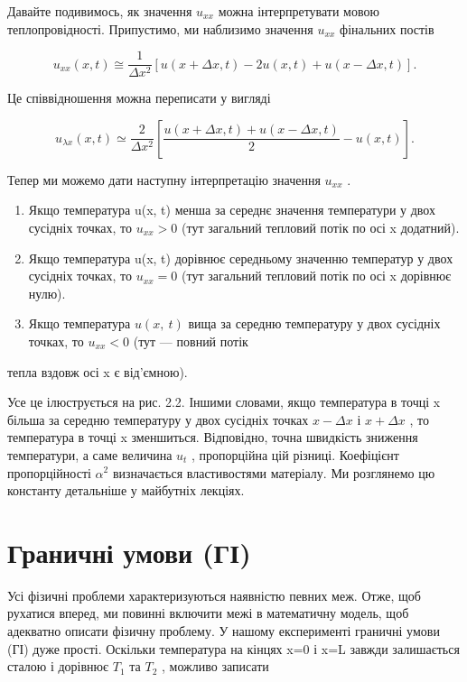\documentclass[
  ukrainian,
]{article}
\begin{document}
Давайте подивимось, як значення \(u_{xx}\) можна інтерпретувати мовою
теплопровідності. Припустимо, ми наблизимо значення \(u_{xx}\) фінальних
постів

\[u_{xx}(x, t) \cong \frac{1}{\Delta x^2} [u(x + \Delta x, t) - 2u(x, t) + u(x - \Delta x, t)].\]

Це співвідношення можна переписати у вигляді

\[u_{\lambda x}(x, t) \simeq \frac{2}{\Delta x^2} \left[ \frac{u(x + \Delta x, t) + u(x - \Delta x, t)}{2} - u(x, t) \right].\]

Тепер ми можемо дати наступну інтерпретацію значення \(u_{xx}\) .

\begin{enumerate}
\def\labelenumi{\arabic{enumi}.}
\item
  Якщо температура u(x, t) менша за середнє значення температури у двох
  сусідніх точках, то \(u_{xx} > 0\) (тут загальний тепловий потік по
  осі x додатний).
\item
  Якщо температура u(x, t) дорівнює середньому значенню температур у
  двох сусідніх точках, то \(u_{xx} = 0\) (тут загальний тепловий потік
  по осі x дорівнює нулю).
\item
  Якщо температура \(u\left(x,\ t\right)\) вища за середню температуру у
  двох сусідніх точках, то \(u_{xx}<0\) (тут --- повний потік
\end{enumerate}

тепла вздовж осі x є від'ємною).

Усе це ілюструється на рис. 2.2. Іншими словами, якщо температура в
точці x більша за середню температуру у двох сусідніх точках
\(x - \Delta x\) і \(x + \Delta x\) , то температура в точці x
зменшиться. Відповідно, точна швидкість зниження температури, а саме
величина \(u_t\) , пропорційна цій різниці. Коефіцієнт пропорційності
\(\alpha^2\) визначається властивостями матеріалу. Ми розглянемо цю
константу детальніше у майбутніх лекціях.

\section{Граничні умови
(ГІ)}\label{ux433ux440ux430ux43dux438ux447ux43dux456-ux443ux43cux43eux432ux438-ux433ux456}

Усі фізичні проблеми характеризуються наявністю певних меж. Отже, щоб
рухатися вперед, ми повинні включити межі в математичну модель, щоб
адекватно описати фізичну проблему. У нашому експерименті граничні умови
(ГІ) дуже прості. Оскільки температура на кінцях x=0 і x=L завжди
залишається сталою і дорівнює \(T_1\) та \(T_2\) , можливо записати
\end{document}
